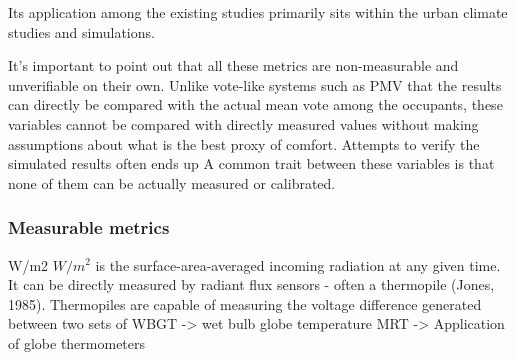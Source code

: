     Its application among the existing studies primarily sits within the urban climate studies and simulations.
    
    It's important to point out that all these metrics are non-measurable and unverifiable on their own. Unlike vote-like systems such as PMV that the results can directly be compared with the actual mean vote among the occupants, these variables cannot be compared with directly measured values without making assumptions about what is the best proxy of comfort. 
    Attempts to verify the simulated results often ends up  
    A common trait between these variables is that none of them can be actually measured or calibrated. 
\subsubsection{Measurable metrics}
        W/m2
        $W/m^2$ is the surface-area-averaged incoming radiation at any given time. It can be directly measured by radiant flux sensors - often a thermopile (Jones, 1985). Thermopiles are capable of measuring the voltage difference generated between two sets of 
        WBGT -> wet bulb globe temperature
        MRT -> Application of globe thermometers




